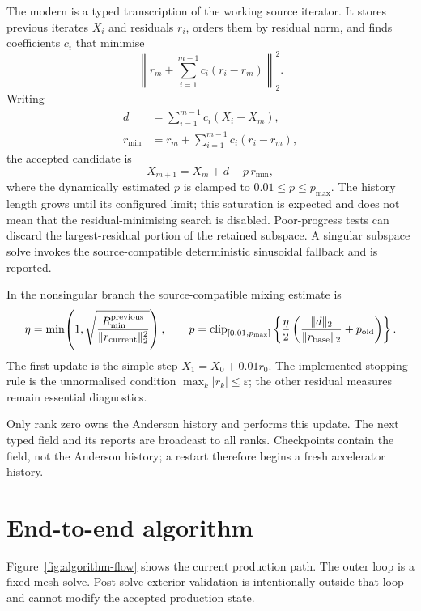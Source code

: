 \documentclass[11pt,a4paper]{article}
\newcommand{\code}[1]{\texttt{\detokenize{#1}}}
\begin{document}
The modern \code{legacy_anderson_t} is a typed transcription of the working
source iterator.  It stores previous iterates $X_i$ and residuals $r_i$,
orders them by residual norm, and finds coefficients $c_i$ that minimise
\begin{equation}
  \left\|r_m+\sum_{i=1}^{m-1}c_i(r_i-r_m)\right\|_2^2.
  \label{eq:anderson-ls}
\end{equation}
Writing
\begin{align}
  d&=\sum_{i=1}^{m-1}c_i(X_i-X_m),\\
  r_{\min}&=r_m+\sum_{i=1}^{m-1}c_i(r_i-r_m),
\end{align}
the accepted candidate is
\begin{equation}
  X_{m+1}=X_m+d+p\,r_{\min},
  \label{eq:anderson-update}
\end{equation}
where the dynamically estimated $p$ is clamped to
$0.01\le p\le p_{\max}$.  The history length grows until its configured limit;
this saturation is expected and does not mean that the residual-minimising
search is disabled.  Poor-progress tests can discard the largest-residual
portion of the retained subspace.  A singular subspace solve invokes the
source-compatible deterministic sinusoidal fallback and is reported.

In the nonsingular branch the source-compatible mixing estimate is
\begin{equation}
  \eta=\min\!\left(1,
    \sqrt{\frac{R_{\min}^{\rm previous}}{\|r_{\rm current}\|_2^2}}\right),
  \qquad
  p=\operatorname{clip}_{[0.01,p_{\max}]}
  \left\{\frac{\eta}{2}
  \left(\frac{\|d\|_2}{\|r_{\rm base}\|_2}+p_{\rm old}\right)\right\}.
  \label{eq:anderson-p}
\end{equation}
The first update is the simple step $X_{1}=X_0+0.01r_0$.  The implemented
stopping rule is the unnormalised condition $\max_k|r_k|\le\varepsilon$; the
other residual measures remain essential diagnostics.

Only rank zero owns the Anderson history and performs this update.  The next
typed field and its reports are broadcast to all ranks.  Checkpoints contain
the field, not the Anderson history; a restart therefore begins a fresh
accelerator history.

\section{End-to-end algorithm}

Figure~\ref{fig:algorithm-flow} shows the current production path.  The outer
loop is a fixed-mesh solve.  Post-solve exterior validation is intentionally
outside that loop and cannot modify the accepted production state.
\end{document}
